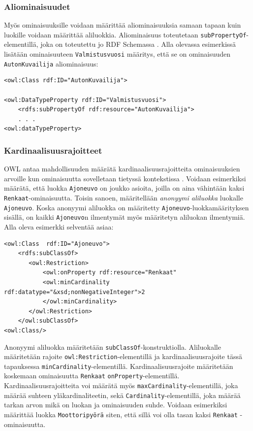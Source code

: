 \documentclass[finnish]{tktltiki2}
\theoremstyle{definition}
\theoremstyle{remark}
\begin{document}
\subsubsection{Aliominaisuudet}
Myös ominaisuuksille voidaan määrittää aliominaisuuksia samaan tapaan kuin luokille voidaan määrittää aliluokkia. Aliominaisuus toteutetaan \texttt{subPropertyOf}-elementillä, joka on toteutettu jo RDF Schemassa \cite{SWM04}. Alla olevassa esimerkissä lisätään ominaisuuteen \texttt{Valmistusvuosi} määritys, että se on ominaisuuden \texttt{AutonKuvailija} aliominaisuus:
\begin{verbatim}
<owl:Class rdf:ID="AutonKuvailija">

<owl:DataTypeProperty rdf:ID="Valmistusvuosi">
    <rdfs:subPropertyOf rdf:resource="AutonKuvailija">
    . . .
<owl:dataTypeProperty>
\end{verbatim}

\subsubsection{Kardinaalisuusrajoitteet}
OWL antaa mahdollisuuden määrätä kardinaalisuusrajoitteita ominaisuuksien arvoille kun ominaisuutta sovelletaan tietyssä kontekstissa \cite{SWM04}. Voidaan esimerkiksi määrätä, että luokka \texttt{Ajoneuvo} on joukko asioita, joilla on aina vähintään kaksi \texttt{Renkaat}-ominaisuutta. Toisin sanoen, määritellään \textit{anonyymi aliluokka} \cite{SWM04} luokalle \texttt{Ajoneuvo}. Koska anonyymi aliluokka on määritetty \texttt{Ajoneuvo}-luokkamäärityksen sisällä, on kaikki \texttt{Ajoneuvo}n  ilmentymät myös määritetyn aliluokan ilmentymiä. Alla oleva esimerkki selventää asiaa:
\begin{verbatim}
<owl:Class  rdf:ID="Ajoneuvo">
    <rdfs:subClassOf>
       <owl:Restriction>
           <owl:onProperty rdf:resource="Renkaat"
           <owl:minCardinality rdf:datatype="&xsd;nonNegativeInteger">2
           </owl:minCardinality>
       </owl:Restriction>
    </owl:subClassOf>
<owl:Class/>
\end{verbatim}
Anonyymi aliluokka määritetään \texttt{subClassOf}-konstruktiolla. Aliluokalle määritetään rajoite \texttt{owl:Restriction}-elementillä ja kardinaalisuusrajoite tässä tapauksessa  \texttt{minCardinality}-elementillä. Kardinaalisuusrajoite määritetään koskemaan ominaisuutta \texttt{Renkaat} \texttt{onProperty}-elementillä. Kardinaalisuusrajoitteita voi määrätä myös \texttt{maxCardinality}-elementillä, joka määrää suhteen yläkardinaliteetin, sekä \texttt{Cardinality}-elementillä, joka määrää tarkan arvon mikä on luokan ja ominaisuuden suhde. Voidaan esimerkiksi määrittää luokka \texttt{Moottoripyörä} siten, että sillä voi olla tasan kaksi \texttt{Renkaat} -ominaisuutta.   
\end{document}
